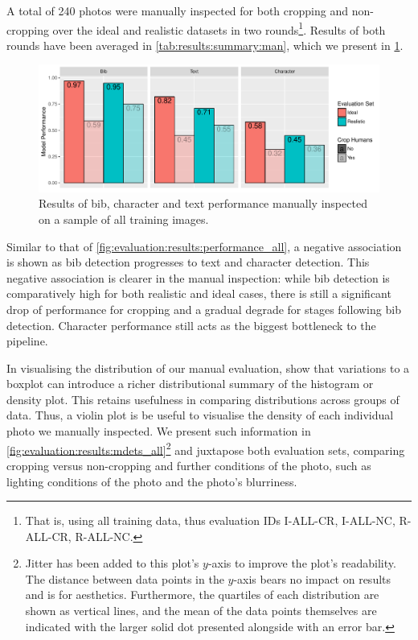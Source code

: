 A total of 240 photos were manually inspected for both cropping and non-cropping over the ideal and realistic datasets in two rounds\footnote{That is, using all training data, thus evaluation IDs I-ALL-CR, I-ALL-NC, R-ALL-CR, R-ALL-NC.}. Results of both rounds have been averaged in \cref{tab:results:summary:man}, which we present in \cref{fig:evaluation:results:performance_man}.

\begin{figure}[h]
  \centering
  \includegraphics[width=1\textwidth]{images/evaluation/ManualSummary}
  \caption[Bib, text and character performance of manual inspection]{Results of bib, character and text performance manually inspected on a sample of all training images.}
  \label{fig:evaluation:results:performance_man}
\end{figure}

Similar to that of \cref{fig:evaluation:results:performance_all}, a negative association is shown as bib detection progresses to text and character detection. This negative association is clearer in the manual inspection: while bib detection is comparatively high for both realistic and ideal cases, there is still a significant drop of performance for cropping and a gradual degrade for stages following bib detection. Character performance still acts as the biggest bottleneck to the pipeline.

In visualising the distribution of our manual evaluation, \citet{wickham:boxplots} show that variations to a boxplot can introduce a richer distributional summary of the histogram or density plot. This retains usefulness in comparing distributions across groups of data. Thus, a violin plot \citep{Hintze:1998fn} is be useful to visualise the density of each individual photo we manually inspected. We present such information in \cref{fig:evaluation:results:mdets_all}\footnote{Jitter has been added to this plot's $y$-axis to improve the plot's readability. The distance between data points in the $y$-axis bears no impact on results and is for aesthetics. Furthermore, the quartiles of each distribution are shown as vertical lines, and the mean of the data points themselves are indicated with the larger solid dot presented alongside with an error bar.} and juxtapose both evaluation sets, comparing cropping versus non-cropping and further conditions of the photo, such as lighting conditions of the photo and the photo's blurriness.

